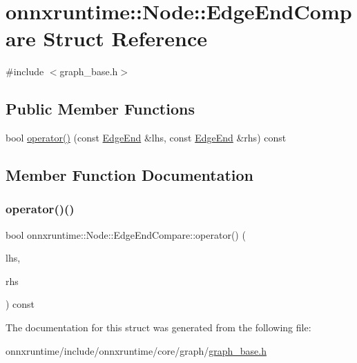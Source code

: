 \hypertarget{structonnxruntime_1_1Node_1_1EdgeEndCompare}{}\section{onnxruntime\+:\+:Node\+:\+:Edge\+End\+Compare Struct Reference}
\label{structonnxruntime_1_1Node_1_1EdgeEndCompare}


{\ttfamily \#include $<$graph\+\_\+base.\+h$>$}

\subsection*{Public Member Functions}
\begin{DoxyCompactItemize}
\item 
bool \mbox{\hyperlink{structonnxruntime_1_1Node_1_1EdgeEndCompare_ad27103285d46f2b558d08d0391d8e8e0}{operator()}} (const \mbox{\hyperlink{classonnxruntime_1_1Node_1_1EdgeEnd}{Edge\+End}} \&lhs, const \mbox{\hyperlink{classonnxruntime_1_1Node_1_1EdgeEnd}{Edge\+End}} \&rhs) const
\end{DoxyCompactItemize}


\subsection{Member Function Documentation}
\mbox{\label{structonnxruntime_1_1Node_1_1EdgeEndCompare_ad27103285d46f2b558d08d0391d8e8e0}} 
\subsubsection{\texorpdfstring{operator()()}{operator()()}}
{\footnotesize\ttfamily bool onnxruntime\+::\+Node\+::\+Edge\+End\+Compare\+::operator() (\begin{DoxyParamCaption}\item[{const \mbox{\hyperlink{classonnxruntime_1_1Node_1_1EdgeEnd}{Edge\+End}} \&}]{lhs,  }\item[{const \mbox{\hyperlink{classonnxruntime_1_1Node_1_1EdgeEnd}{Edge\+End}} \&}]{rhs }\end{DoxyParamCaption}) const\hspace{0.3cm}{\ttfamily [inline]}}



The documentation for this struct was generated from the following file\+:\begin{DoxyCompactItemize}
\item 
onnxruntime/include/onnxruntime/core/graph/\mbox{\hyperlink{graph__base_8h}{graph\+\_\+base.\+h}}\end{DoxyCompactItemize}
